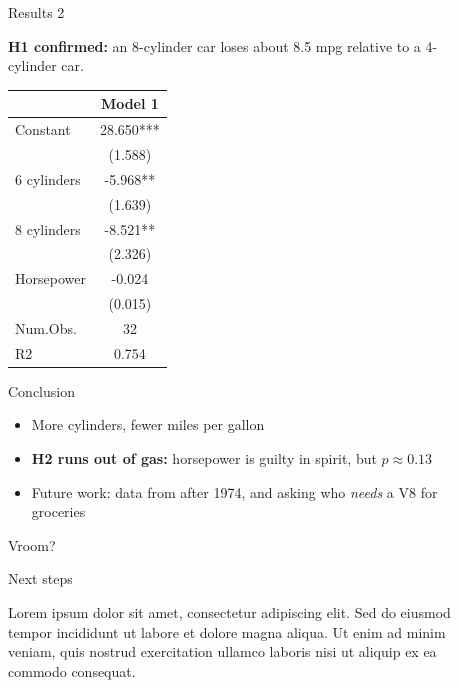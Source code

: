 \documentclass[final]{beamer}
\providecommand{\tightlist}{%
  \setlength{\itemsep}{0pt}\setlength{\parskip}{0pt}}
\newlength{\sepwidth}
\newlength{\colwidth}
\newcommand{\separatorcolumn}{\begin{column}{\sepwidth}\end{column}}
\begin{document}
\begin{frame}[t,fragile]
\begin{columns}[t]
\begin{column}{\colwidth}
\end{column}

\separatorcolumn

\begin{column}{\colwidth}

\begin{block}{Results 2}

\textbf{H1 confirmed:} an 8-cylinder car loses about 8.5 mpg relative to
a 4-cylinder car.

\begin{center}\LARGE

\begin{tabular}{lc}
\toprule
 & Model 1\\
\midrule
Constant & 28.650***\\
 & (1.588)\\
6 cylinders & -5.968**\\
 & (1.639)\\
8 cylinders & -8.521**\\
 & (2.326)\\
Horsepower & -0.024\\
 & (0.015)\\
Num.Obs. & 32\\
R2 & 0.754\\
\bottomrule
\end{tabular}
\end{center}

\end{block}

\begin{block}{Conclusion}

\begin{itemize}
\tightlist
\item
  More cylinders, fewer miles per gallon
\item
  \textbf{H2 runs out of gas:} horsepower is guilty in spirit, but
  \(p \approx 0.13\)
\item
  Future work: data from after 1974, and asking who \emph{needs} a V8
  for groceries
\end{itemize}

Vroom?

\end{block}

\begin{block}{Next steps}

Lorem ipsum dolor sit amet, consectetur adipiscing elit. Sed do eiusmod
tempor incididunt ut labore et dolore magna aliqua. Ut enim ad minim
veniam, quis nostrud exercitation ullamco laboris nisi ut aliquip ex ea
commodo consequat.


\end{block}
\end{column}
\end{columns}
\end{frame}
\end{document}
